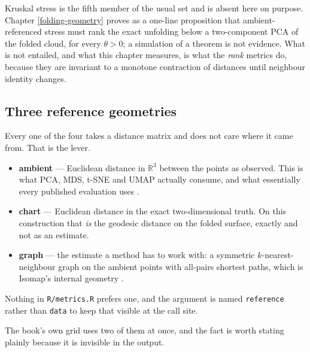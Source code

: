 \documentclass[
  british,
  a4paper,
]{book}
\providecommand{\tightlist}{%
  \setlength{\itemsep}{0pt}\setlength{\parskip}{0pt}}
\begin{document}
Kruskal stress \citep{kruskal1964fit} is the fifth member of the usual set and is
absent here on purpose. Chapter \ref{folding-geometry} proves as a one-line
proposition that ambient-referenced stress must rank the exact unfolding below a
two-component PCA of the folded cloud, for every \(\theta > 0\); a simulation of a
theorem is not evidence. What is not entailed, and what this chapter measures,
is what the \emph{rank} metrics do, because they are invariant to a monotone
contraction of distances until neighbour identity changes.

\subsection{Three reference geometries}\label{three-reference-geometries}

Every one of the four takes a distance matrix and does not care where it came
from. That is the lever.

\begin{itemize}
\tightlist
\item
  \textbf{ambient} --- Euclidean distance in \(\mathbb{R}^3\) between the points as
  observed. This is what PCA, MDS, t-SNE and UMAP actually consume, and what
  essentially every published evaluation uses \citep{espadoto2021survey}.
\item
  \textbf{chart} --- Euclidean distance in the exact two-dimensional truth. On this
  construction that \emph{is} the geodesic distance on the folded surface, exactly
  and not as an estimate.
\item
  \textbf{graph} --- the estimate a method has to work with: a symmetric \(k\)-nearest-
  neighbour graph on the ambient points with all-pairs shortest paths, which is
  Isomap's internal geometry \citep{tenenbaum2000isomap}.
\end{itemize}

Nothing in \texttt{R/metrics.R} prefers one, and the argument is named \texttt{reference}
rather than \texttt{data} to keep that visible at the call site.

The book's own grid uses two of them at once, and the fact is worth stating
plainly because it is invisible in the output.
\end{document}
